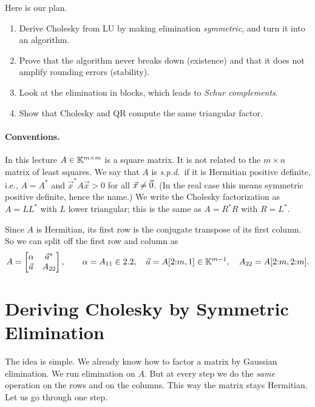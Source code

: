 Here is our plan.
\begin{enumerate}
  \item Derive Cholesky from LU by making elimination \emph{symmetric}, and turn it into an algorithm.
  \item Prove that the algorithm never breaks down (existence) and that it does not amplify rounding errors (stability).
  \item Look at the elimination in blocks, which leads to \emph{Schur complements}.
  \item Show that Cholesky and QR compute the same triangular factor.
\end{enumerate}

\paragraph{Conventions.} In this lecture $A \in \mathbb{K}^{m \times m}$ is a square matrix. It is not related to the $m \times n$ matrix of least squares. We say that $A$ is \emph{s.p.d.}\ if it is Hermitian positive definite, i.e., $A = A^\ast$ and $\vec{x}^\ast A\vec{x} > 0$ for all $\vec{x} \ne \vec{0}$. (In the real case this means symmetric positive definite, hence the name.) We write the Cholesky factorization as $A = LL^\ast$ with $L$ lower triangular; this is the same as $A = R^\ast R$ with $R = L^\ast$.

Since $A$ is Hermitian, its first row is the conjugate transpose of its first column. So we can split off the first row and column as
\begin{equation}
  \label{eq:chol-block}
  A = \begin{bmatrix} \alpha & \vec{a}^\ast \\ \vec{a} & A_{22} \end{bmatrix}, \qquad \alpha = A_{11} \in 2.2, \quad \vec{a} = A[2{:}m, 1] \in \mathbb{K}^{m-1}, \quad A_{22} = A[2{:}m, 2{:}m].
\end{equation}

\section{Deriving Cholesky by Symmetric Elimination}
\label{sec:chol-derive}

The idea is simple. We already know how to factor a matrix by Gaussian elimination. We run elimination on $A$. But at every step we do the \emph{same} operation on the rows and on the columns. This way the matrix stays Hermitian. Let us go through one step.

